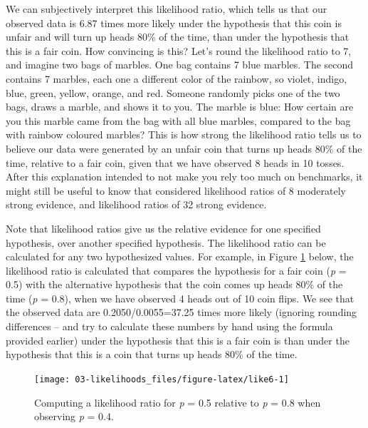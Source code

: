 \documentclass[
  oneside]{krantz}
\begin{document}
We can subjectively interpret this likelihood ratio, which tells us that our observed data is 6.87 times more likely under the hypothesis that this coin is unfair and will turn up heads 80\% of the time, than under the hypothesis that this is a fair coin. How convincing is this? Let's round the likelihood ratio to 7, and imagine two bags of marbles. One bag contains 7 blue marbles. The second contains 7 marbles, each one a different color of the rainbow, so violet, indigo, blue, green, yellow, orange, and red. Someone randomly picks one of the two bags, draws a marble, and shows it to you. The marble is blue: How certain are you this marble came from the bag with all blue marbles, compared to the bag with rainbow coloured marbles? This is how strong the likelihood ratio tells us to believe our data were generated by an unfair coin that turns up heads 80\% of the time, relative to a fair coin, given that we have observed 8 heads in 10 tosses. After this explanation intended to not make you rely too much on benchmarks, it might still be useful to know that \citet{royall_statistical_1997} considered likelihood ratios of 8 moderately strong evidence, and likelihood ratios of 32 strong evidence.

Note that likelihood ratios give us the relative evidence for one specified hypothesis, over another specified hypothesis. The likelihood ratio can be calculated for any two hypothesized values. For example, in Figure \ref{fig:like6} below, the likelihood ratio is calculated that compares the hypothesis for a fair coin (\emph{p} = 0.5) with the alternative hypothesis that the coin comes up heads 80\% of the time (\emph{p} = 0.8), when we have observed 4 heads out of 10 coin flips. We see that the observed data are 0.2050/0.0055=37.25 times more likely (ignoring rounding differences -- and try to calculate these numbers by hand using the formula provided earlier) under the hypothesis that this is a fair coin is than under the hypothesis that this is a coin that turns up heads 80\% of the time.



\begin{figure}

{\centering \texttt{[image: 03-likelihoods\_files/figure-latex/like6-1]} 

}

\caption{Computing a likelihood ratio for \emph{p} = 0.5 relative to \emph{p} = 0.8 when observing \emph{p} = 0.4.}\label{fig:like6}
\end{figure}
\end{document}

